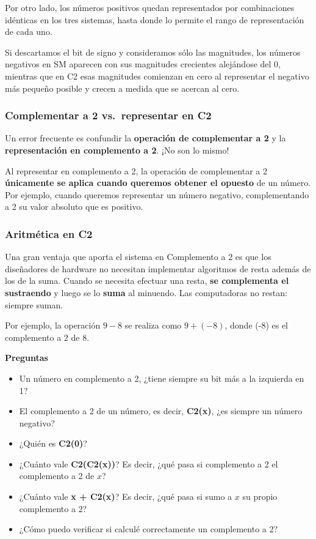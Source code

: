 \documentclass[spanish,A4,]{article}
\begin{document}
Por otro lado, los números positivos quedan representados por
combinaciones idénticas en los tres sistemas, hasta donde lo permite el
rango de representación de cada uno.

Si descartamos el bit de signo y consideramos sólo las magnitudes, los
números negativos en SM aparecen con sus magnitudes crecientes
alejándose del 0, mientras que en C2 esas magnitudes comienzan en cero
al representar el negativo más pequeño posible y crecen a medida que se
acercan al cero.

\subsubsection{Complementar a 2 vs.~representar en
C2}\label{complementar-a-2-vs.representar-en-c2}

Un error frecuente es confundir la \textbf{operación de complementar a
2} y la \textbf{representación en complemento a 2}. ¡No son lo mismo!

Al representar en complemento a 2, la operación de complementar a 2
\textbf{únicamente se aplica cuando queremos obtener el opuesto} de un
número. Por ejemplo, cuando queremos representar un número negativo,
complementando a 2 su valor absoluto que es positivo.

\subsubsection{Aritmética en C2}\label{aritmuxe9tica-en-c2}

Una gran ventaja que aporta el sistema en Complemento a 2 es que los
diseñadores de hardware no necesitan implementar algoritmos de resta
además de los de la suma. Cuando se necesita efectuar una resta,
\textbf{se complementa el sustraendo} y luego se lo \textbf{suma} al
minuendo. Las computadoras no restan: siempre suman.

Por ejemplo, la operación $9 - 8$ se realiza como $9 + (-8)$, donde (-8)
es el complemento a 2 de 8.

\textbf{Preguntas}

\begin{itemize}
\itemsep1pt\parskip0pt
\item
  Un número en complemento a 2, ¿tiene siempre su bit más a la izquierda
  en 1?
\item
  El complemento a 2 de un número, es decir, \textbf{C2(x)}, ¿es siempre
  un número negativo?
\item
  ¿Quién es \textbf{C2(0)}?
\item
  ¿Cuánto vale \textbf{C2(C2(x))}? Es decir, ¿qué pasa si complemento a
  2 el complemento a 2 de $x$?
\item
  ¿Cuánto vale \textbf{x + C2(x)}? Es decir, ¿qué pasa si sumo a $x$ su
  propio complemento a 2?
\item
  ¿Cómo puedo verificar si calculé correctamente un complemento a 2?
\end{itemize}
\end{document}
